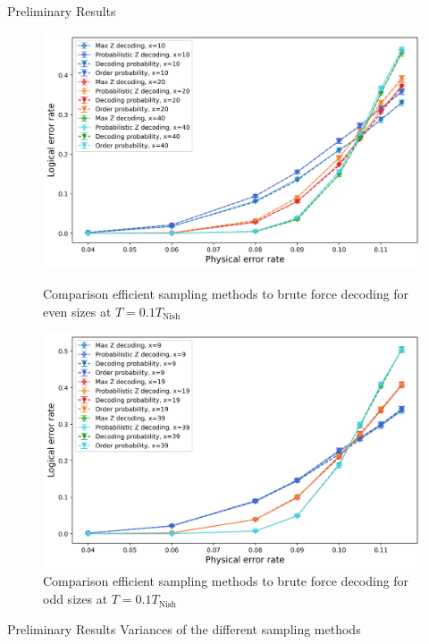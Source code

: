 \documentclass{dfki}
\begin{document}
\begin{frame}{Preliminary Results}
	\begin{figure}[h!]
		\centering
		\begin{minipage}{0.45\textwidth}
			\centering
			\includegraphics[width=\textwidth]{fig/MaxZ_ProbabilisticZ_OrderProb_DecodingProb_even_T01.png}
			\caption{Comparison efficient sampling methods to brute force decoding for even sizes at $T=0.1T_{\text{Nish}}$}
		\end{minipage} \hfill
		\begin{minipage}{0.45\textwidth}
			\centering
			\includegraphics[width=\textwidth]{fig/MaxZ_ProbabilisticZ_OrderProb_DecodingProb_odd_T01.png}
			\caption{Comparison efficient sampling methods to brute force decoding for odd sizes at $T=0.1T_{\text{Nish}}$}
		\end{minipage}
	\end{figure}
\end{frame}

\begin{frame}{Preliminary Results}
	Variances of the different sampling methods
\end{frame}
\end{document}
